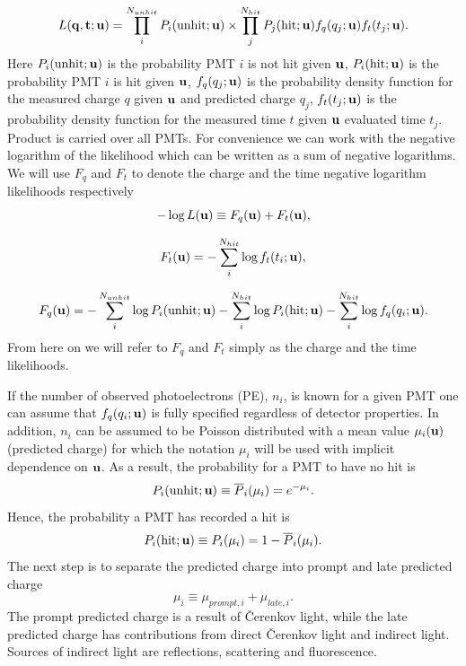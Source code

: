 \begin{equation}
	L({\bf q, t; u})=\prod_i^{N_{unhit}} P_i(\text{unhit}; {\bf u})\times\prod_j^{N_{hit}} P_j(\text{hit}; {\bf u})f_q(q_j;{\bf u}) f_t(t_j;{\bf u}).
\end{equation}
Here $P_i(\text{unhit}; {\bf u})$ is the probability PMT $i$ is not hit given ${\bf u}$,
$P_i(\text{hit}; {\bf u})$ is the probability PMT $i$ is hit given ${\bf u}$,
$f_q(q_j;{\bf u})$ is the probability density function for the measured charge $q$ given ${\bf u}$ and
predicted charge $q_j$,
$f_t(t_j;{\bf u})$ is the probability density function for the measured time $t$ given ${\bf u}$
evaluated time $t_j$. Product is carried over all PMTs. For convenience 
we can work with the negative logarithm of the likelihood which can 
be written as a sum of negative logarithms. We will use $F_q$ and $F_t$ to denote the
charge and the time negative logarithm likelihoods respectively  
\begin{equation}
	-\log L({\bf u}) \equiv F_q({\bf u}) + F_t({\bf u}),
\end{equation}

\begin{equation}
	F_t({\bf u}) = -\sum_i^{N_{hit}} \log f_t(t_i;{\bf u}),
\end{equation}

\begin{equation}
	F_q({\bf u}) = -\sum_i^{N_{unhit}}\log P_i(\text{unhit}; {\bf u})-\sum_i^{N_{hit}}\log P_i(\text{hit}; {\bf u}) - \sum_i^{N_{hit}} \log f_q(q_i;{\bf u}).
\end{equation}
From here on we will refer to $F_q$ and $F_t$ simply as the charge and the time likelihoods.

If the number of observed photoelectrons (PE), $n_i$, is known for a given PMT one can assume
that $f_q(q_i;{\bf u})$ is fully specified regardless of detector properties.
In addition, $n_i$ can be assumed to be Poisson distributed with a mean value
$\mu_i({\bf u})$ (predicted charge) for which the notation $\mu_i$ will be
used with implicit dependence on ${\bf u}$. As a result, the probability
for a PMT to have no hit is
\begin{equation}
	P_i(\text{unhit}; {\bf u})\equiv\overline P_i(\mu_i)=e^{-\mu_i}.
\end{equation}
Hence, the probability a PMT has recorded a hit is
\begin{equation}
	P_i(\text{hit}; {\bf u})\equiv P_i(\mu_i)=1-\overline P_i(\mu_i).
\end{equation}
The next step is to separate the predicted charge into prompt and late predicted charge
\begin{equation}
	\mu_i \equiv \mu_{prompt,i} + \mu_{late,i}.
\end{equation}
The prompt predicted charge is a result of \v{C}erenkov light, while the
late predicted charge has contributions from direct \v{C}erenkov light and
indirect light. Sources of indirect light are reflections, scattering and 
fluorescence.

